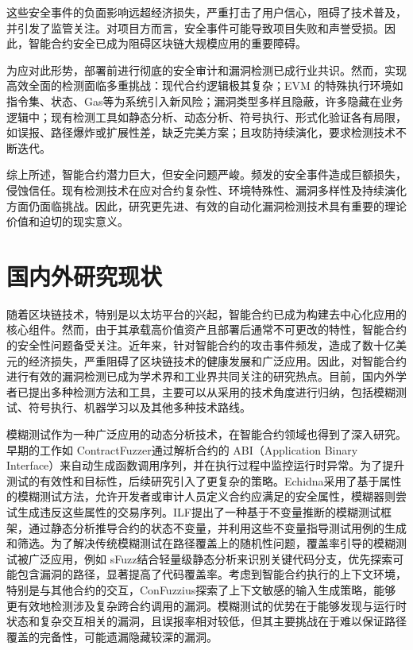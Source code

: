 \documentclass[print, master, vlined, timesmath]{DissertUESTC}
\begin{document}
这些安全事件的负面影响远超经济损失，严重打击了用户信心，阻碍了技术普及，并引发了监管关注\textsuperscript{\cite{SmartContract_2021}}。对项目方而言，安全事件可能导致项目失败和声誉受损。因此，智能合约安全已成为阻碍区块链大规模应用的重要障碍。

为应对此形势，部署前进行彻底的安全审计和漏洞检测已成行业共识\textsuperscript{\cite{FormalMethods_2022}}。然而，实现高效全面的检测面临多重挑战：现代合约逻辑极其复杂；EVM 的特殊执行环境如指令集、状态、Gas等为系统引入新风险；漏洞类型多样且隐蔽\textsuperscript{\cite{Blockchainsmart_2020}}，许多隐藏在业务逻辑中；现有检测工具如静态分析、动态分析、符号执行、形式化验证各有局限，如误报、路径爆炸或扩展性差，缺乏完美方案\textsuperscript{\cite{Howeffective_2020}}；且攻防持续演化，要求检测技术不断迭代。

综上所述，智能合约潜力巨大，但安全问题严峻。频发的安全事件造成巨额损失，侵蚀信任。现有检测技术在应对合约复杂性、环境特殊性、漏洞多样性及持续演化方面仍面临挑战。因此，研究更先进、有效的自动化漏洞检测技术具有重要的理论价值和迫切的现实意义。


\section{国内外研究现状}

随着区块链技术，特别是以太坊平台的兴起，智能合约已成为构建去中心化应用的核心组件。然而，由于其承载高价值资产且部署后通常不可更改的特性，智能合约的安全性问题备受关注。近年来，针对智能合约的攻击事件频发，造成了数十亿美元的经济损失，严重阻碍了区块链技术的健康发展和广泛应用\textsuperscript{\cite{jiao2024survey}}。因此，对智能合约进行有效的漏洞检测已成为学术界和工业界共同关注的研究热点。目前，国内外学者已提出多种检测方法和工具，主要可以从采用的技术角度进行归纳，包括模糊测试、符号执行、机器学习以及其他多种技术路线。

模糊测试作为一种广泛应用的动态分析技术，在智能合约领域也得到了深入研究。早期的工作如 ContractFuzzer\textsuperscript{\cite{jiang2018contractfuzzer}}通过解析合约的 ABI（Application Binary Interface）来自动生成函数调用序列，并在执行过程中监控运行时异常。为了提升测试的有效性和目标性，后续研究引入了更复杂的策略。Echidna\textsuperscript{\cite{grieco2020echidna}}采用了基于属性的模糊测试方法，允许开发者或审计人员定义合约应满足的安全属性，模糊器则尝试生成违反这些属性的交易序列。ILF\textsuperscript{\cite{he2019learning}}提出了一种基于不变量推断的模糊测试框架，通过静态分析推导合约的状态不变量，并利用这些不变量指导测试用例的生成和筛选。为了解决传统模糊测试在路径覆盖上的随机性问题，覆盖率引导的模糊测试被广泛应用，例如 sFuzz\textsuperscript{\cite{nguyen2020sfuzz}}结合轻量级静态分析来识别关键代码分支，优先探索可能包含漏洞的路径，显著提高了代码覆盖率。考虑到智能合约执行的上下文环境，特别是与其他合约的交互，ConFuzzius\textsuperscript{\cite{jiang2018contractfuzzer}}探索了上下文敏感的输入生成策略，能够更有效地检测涉及复杂跨合约调用的漏洞。模糊测试的优势在于能够发现与运行时状态和复杂交互相关的漏洞，且误报率相对较低，但其主要挑战在于难以保证路径覆盖的完备性，可能遗漏隐藏较深的漏洞。
\end{document}
